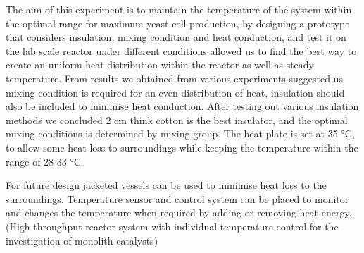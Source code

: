 The aim of this experiment is to maintain the temperature of the system within the optimal range for maximum yeast cell production, by designing a prototype that considers insulation, mixing condition and heat conduction, and test it on the lab scale reactor under different conditions allowed us to find the best way to create an uniform heat distribution within the reactor as well as steady temperature. From results we obtained from various experiments suggested us mixing condition is required for an even distribution of heat, insulation should also be included to minimise heat conduction. After testing out various insulation methods we concluded 2 cm think cotton is the best insulator, and the optimal mixing conditions is determined by mixing group. The heat plate is set at 35 \si{\celsius}, to allow some heat loss to surroundings while keeping the temperature within the range of 28-33 \si{\celsius}. 

For future design jacketed vessels \cite{VerisovaMarcela2015Htia} can be used to minimise heat loss to the surroundings. Temperature sensor and control system can be placed to monitor and changes the temperature when required by adding or removing heat energy. (High-throughput reactor system with individual temperature control for the investigation of monolith catalysts) 